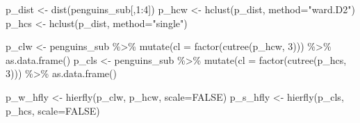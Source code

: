 \documentclass[
  letterpaper,
]{krantz}
\newenvironment{Shaded}{\begin{snugshade}}{\end{snugshade}}
\newcommand{\AttributeTok}[1]{\textcolor[rgb]{0.40,0.45,0.13}{#1}}
\newcommand{\ConstantTok}[1]{\textcolor[rgb]{0.56,0.35,0.01}{#1}}
\newcommand{\DecValTok}[1]{\textcolor[rgb]{0.68,0.00,0.00}{#1}}
\newcommand{\FunctionTok}[1]{\textcolor[rgb]{0.28,0.35,0.67}{#1}}
\newcommand{\NormalTok}[1]{\textcolor[rgb]{0.00,0.23,0.31}{#1}}
\newcommand{\OtherTok}[1]{\textcolor[rgb]{0.00,0.23,0.31}{#1}}
\newcommand{\SpecialCharTok}[1]{\textcolor[rgb]{0.37,0.37,0.37}{#1}}
\newcommand{\StringTok}[1]{\textcolor[rgb]{0.13,0.47,0.30}{#1}}
\begin{document}
\begin{Shaded}
\begin{Highlighting}[]
\NormalTok{p\_dist }\OtherTok{\textless{}{-}} \FunctionTok{dist}\NormalTok{(penguins\_sub[,}\DecValTok{1}\SpecialCharTok{:}\DecValTok{4}\NormalTok{])}
\NormalTok{p\_hcw }\OtherTok{\textless{}{-}} \FunctionTok{hclust}\NormalTok{(p\_dist, }\AttributeTok{method=}\StringTok{"ward.D2"}\NormalTok{)}
\NormalTok{p\_hcs }\OtherTok{\textless{}{-}} \FunctionTok{hclust}\NormalTok{(p\_dist, }\AttributeTok{method=}\StringTok{"single"}\NormalTok{)}

\NormalTok{p\_clw }\OtherTok{\textless{}{-}}\NormalTok{ penguins\_sub }\SpecialCharTok{\%\textgreater{}\%} 
  \FunctionTok{mutate}\NormalTok{(}\AttributeTok{cl =} \FunctionTok{factor}\NormalTok{(}\FunctionTok{cutree}\NormalTok{(p\_hcw, }\DecValTok{3}\NormalTok{))) }\SpecialCharTok{\%\textgreater{}\%}
  \FunctionTok{as.data.frame}\NormalTok{()}
\NormalTok{p\_cls }\OtherTok{\textless{}{-}}\NormalTok{ penguins\_sub }\SpecialCharTok{\%\textgreater{}\%} 
  \FunctionTok{mutate}\NormalTok{(}\AttributeTok{cl =} \FunctionTok{factor}\NormalTok{(}\FunctionTok{cutree}\NormalTok{(p\_hcs, }\DecValTok{3}\NormalTok{))) }\SpecialCharTok{\%\textgreater{}\%}
  \FunctionTok{as.data.frame}\NormalTok{()}

\NormalTok{p\_w\_hfly }\OtherTok{\textless{}{-}} \FunctionTok{hierfly}\NormalTok{(p\_clw, p\_hcw, }\AttributeTok{scale=}\ConstantTok{FALSE}\NormalTok{)}
\NormalTok{p\_s\_hfly }\OtherTok{\textless{}{-}} \FunctionTok{hierfly}\NormalTok{(p\_cls, p\_hcs, }\AttributeTok{scale=}\ConstantTok{FALSE}\NormalTok{)}
\end{Highlighting}
\end{Shaded}
\end{document}
